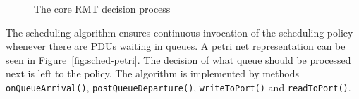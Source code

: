             \begin{figure}[H]
                \begin{center}
                  \caption{The core RMT decision process}
                  \label{fig:rmt-fsm}
                \end{center}
            \end{figure}

            The scheduling algorithm ensures continuous invocation of the scheduling policy whenever there are PDUs waiting in queues. A petri net representation can be seen in Figure~\ref{fig:sched-petri}. The decision of what queue should be processed next is left to the policy. The algorithm is implemented by methods \texttt{onQueueArrival()}, \texttt{postQueueDeparture()}, \texttt{writeToPort()} and \texttt{readToPort()}.


